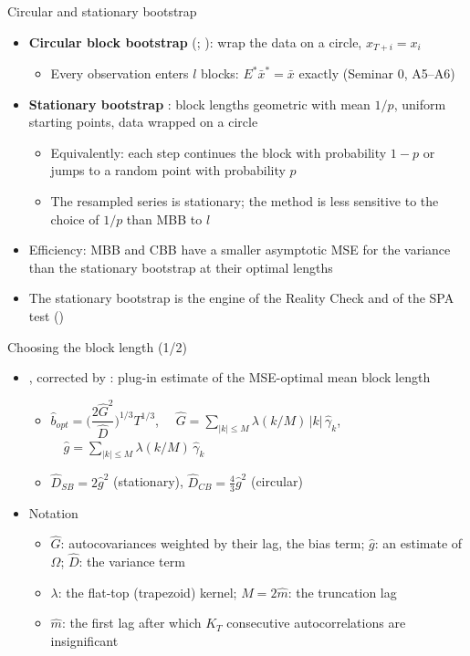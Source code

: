 \begin{frame}{Circular and stationary bootstrap}
\itemsize{\footnotesize}
\begin{itemize}
    \item \textbf{Circular block bootstrap} (; ): wrap the data on a circle, $x_{T+i} = x_i$
    \begin{itemize}
        \item Every observation enters $l$ blocks: $E^*\bar x^* = \bar x$ exactly (Seminar 0, A5--A6)
    \end{itemize}
    \item \textbf{Stationary bootstrap} : block lengths geometric with mean $1/p$, uniform starting points, data wrapped on a circle
    \begin{itemize}
        \item Equivalently: each step continues the block with probability $1 - p$ or jumps to a random point with probability $p$
        \item The resampled series is stationary; the method is less sensitive to the choice of $1/p$ than MBB to $l$
    \end{itemize}
    \item Efficiency: MBB and CBB have a smaller asymptotic MSE for the variance than the stationary bootstrap at their optimal lengths 
    \item The stationary bootstrap is the engine of the Reality Check  and of the SPA test ()
\end{itemize}
\end{frame}

\begin{frame}{Choosing the block length (1/2)}
\itemsize{\small}
\begin{itemize}
    \item {}, corrected by : plug-in estimate of the MSE-optimal mean block length
    \begin{itemize}
        \item $\hat b_{opt} = \Big(\dfrac{2\hat G^2}{\hat D}\Big)^{1/3} T^{1/3}$, $\quad \hat G = \sum_{|k|\le M}\lambda(k/M)\,|k|\,\hat\gamma_k$, $\quad \hat g = \sum_{|k|\le M}\lambda(k/M)\,\hat\gamma_k$
        \item $\hat D_{SB} = 2\hat g^2$ (stationary), $\hat D_{CB} = \tfrac{4}{3}\hat g^2$ (circular)
    \end{itemize}
    \item Notation
    \begin{itemize}
        \item $\hat G$: autocovariances weighted by their lag, the bias term; $\hat g$: an estimate of $\Omega$; $\hat D$: the variance term
        \item $\lambda$: the flat-top (trapezoid) kernel; $M = 2\hat m$: the truncation lag
        \item $\hat m$: the first lag after which $K_T$ consecutive autocorrelations are insignificant
    \end{itemize}
\end{itemize}
\end{frame}

